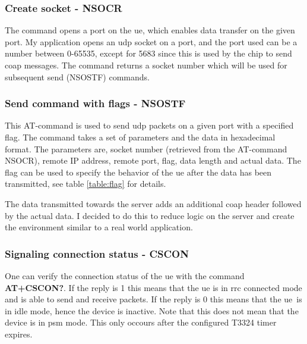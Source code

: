 \documentclass[USenglish]{ifimaster}  %
\begin{document}
\subsubsection{Create socket - NSOCR}
The command opens a port on the \acrshort{ue}, which enables data transfer on the given port. My application opens an \acrshort{udp} socket on a port, and the port used can be a number between 0-65535, except for 5683 since this is used by the chip to send \acrshort{coap} messages. The command returns a socket number which will be used for subsequent send (NSOSTF) commands.

\subsubsection{Send command with flags - NSOSTF}
This AT-command is used to send \acrshort{udp} packets on a given port with a specified flag. The command takes a set of parameters and the data in hexadecimal format. The parameters are, socket number (retrieved from the AT-command NSOCR), remote IP address, remote port, flag, data length and actual data. The flag can be used to specify the behavior of the \acrshort{ue} after the data has been transmitted, see table \vref{table:flag} for details.

\begin{table}[H]
\centering
{}
\caption[\acrshort{nb-iot} send command flag options]{Transmit flag options}
\label{table:flag}
\end{table}

The data transmitted towards the server adds an additional \acrshort{coap} header followed by the actual data. I decided to do this to reduce logic on the server and create the environment similar to a real world application.

\subsubsection{Signaling connection status - CSCON}
One can verify the connection status of the \acrshort{ue} with the command \textbf{AT+CSCON?}. If the reply is 1 this means that the \acrshort{ue} is in \acrshort{rrc} connected mode and is able to send and receive packets. If the reply is 0 this means that the \acrshort{ue} is in idle mode, hence the device is inactive. Note that this does not mean that the device is in \acrshort{psm} mode. This only occours after the configured \acrshort{T3324} timer expires.
\end{document}
